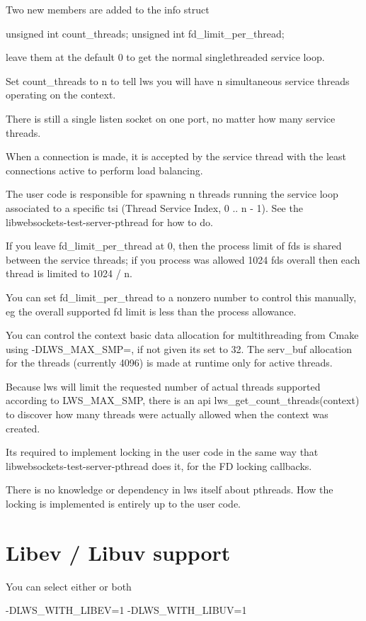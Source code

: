 Two new members are added to the info struct \begin{DoxyVerb}    unsigned int count_threads;
    unsigned int fd_limit_per_thread;
\end{DoxyVerb}


leave them at the default 0 to get the normal singlethreaded service loop.

Set count\+\_\+threads to n to tell lws you will have n simultaneous service threads operating on the context.

There is still a single listen socket on one port, no matter how many service threads.

When a connection is made, it is accepted by the service thread with the least connections active to perform load balancing.

The user code is responsible for spawning n threads running the service loop associated to a specific tsi (Thread Service Index, 0 .. n -\/ 1). See the libwebsockets-\/test-\/server-\/pthread for how to do.

If you leave fd\+\_\+limit\+\_\+per\+\_\+thread at 0, then the process limit of fds is shared between the service threads; if you process was allowed 1024 fds overall then each thread is limited to 1024 / n.

You can set fd\+\_\+limit\+\_\+per\+\_\+thread to a nonzero number to control this manually, eg the overall supported fd limit is less than the process allowance.

You can control the context basic data allocation for multithreading from Cmake using -\/\+D\+L\+W\+S\+\_\+\+M\+A\+X\+\_\+\+S\+MP=, if not given it\textquotesingle{}s set to 32. The serv\+\_\+buf allocation for the threads (currently 4096) is made at runtime only for active threads.

Because lws will limit the requested number of actual threads supported according to L\+W\+S\+\_\+\+M\+A\+X\+\_\+\+S\+MP, there is an api lws\+\_\+get\+\_\+count\+\_\+threads(context) to discover how many threads were actually allowed when the context was created.

It\textquotesingle{}s required to implement locking in the user code in the same way that libwebsockets-\/test-\/server-\/pthread does it, for the FD locking callbacks.

There is no knowledge or dependency in lws itself about pthreads. How the locking is implemented is entirely up to the user code.\hypertarget{md_README.coding_libevuv}{}\section{Libev / Libuv support}\label{md_README.coding_libevuv}
You can select either or both \begin{DoxyVerb}    -DLWS_WITH_LIBEV=1
    -DLWS_WITH_LIBUV=1
\end{DoxyVerb}


